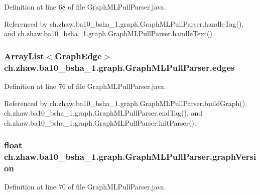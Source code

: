 Definition at line 68 of file GraphMLPullParser.java.

Referenced by ch.zhaw.ba10\_\-bsha\_\-1.graph.GraphMLPullParser.handleTag(), and ch.zhaw.ba10\_\-bsha\_\-1.graph.GraphMLPullParser.handleText().\hypertarget{classch_1_1zhaw_1_1ba10__bsha__1_1_1graph_1_1GraphMLPullParser_a181a350c69c351b9f21d914202abaee4}{
\subsubsection[{edges}]{\setlength{\rightskip}{0pt plus 5cm}ArrayList$<${\bf GraphEdge}$>$ {\bf ch.zhaw.ba10\_\-bsha\_\-1.graph.GraphMLPullParser.edges}}}
\label{classch_1_1zhaw_1_1ba10__bsha__1_1_1graph_1_1GraphMLPullParser_a181a350c69c351b9f21d914202abaee4}


Definition at line 76 of file GraphMLPullParser.java.

Referenced by ch.zhaw.ba10\_\-bsha\_\-1.graph.GraphMLPullParser.buildGraph(), ch.zhaw.ba10\_\-bsha\_\-1.graph.GraphMLPullParser.endTag(), and ch.zhaw.ba10\_\-bsha\_\-1.graph.GraphMLPullParser.initParser().\hypertarget{classch_1_1zhaw_1_1ba10__bsha__1_1_1graph_1_1GraphMLPullParser_a212c61eb8990534e883cda1e29c60589}{
\subsubsection[{graphVersion}]{\setlength{\rightskip}{0pt plus 5cm}float {\bf ch.zhaw.ba10\_\-bsha\_\-1.graph.GraphMLPullParser.graphVersion}}}
\label{classch_1_1zhaw_1_1ba10__bsha__1_1_1graph_1_1GraphMLPullParser_a212c61eb8990534e883cda1e29c60589}


Definition at line 70 of file GraphMLPullParser.java.

